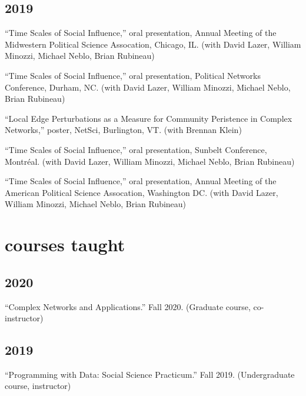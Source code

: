 \documentclass[11pt, letter]{article}
\begin{document}
\subsection{2019}
\begin{hangparas}{.25in}{1}
``Time Scales of Social Influence,'' oral presentation, Annual Meeting of the Midwestern Political Science Assocation, Chicago, IL. (with David Lazer, William Minozzi, Michael Neblo, Brian Rubineau)
\vspace{2mm}

``Time Scales of Social Influence,'' oral presentation, Political Networks Conference, Durham, NC. (with David Lazer, William Minozzi, Michael Neblo, Brian Rubineau)
\vspace{2mm}

``Local Edge Perturbations as a Measure for Community Peristence in Complex Networks,'' poster, NetSci, Burlington, VT. (with Brennan Klein)
\vspace{2mm}

``Time Scales of Social Influence,'' oral presentation, Sunbelt Conference, Montréal. (with David Lazer, William Minozzi, Michael Neblo, Brian Rubineau)
\vspace{2mm}

``Time Scales of Social Influence,'' oral presentation, Annual Meeting of the American Political Science Assocation, Washington DC. (with David Lazer, William Minozzi, Michael Neblo, Brian Rubineau)
\vspace{2mm}
\end{hangparas}

\vspace{2mm}
\section{courses taught}
\subsection{2020}
\begin{hangparas}{.25in}{1}
``Complex Networks and Applications.'' Fall 2020. (Graduate course, co-instructor)
\end{hangparas}
\vspace{1mm}

\subsection{2019}
\begin{hangparas}{.25in}{1}
``Programming with Data: Social Science Practicum.'' Fall 2019. (Undergraduate course, instructor) \vspace{2mm}
\end{hangparas}
\end{document}
